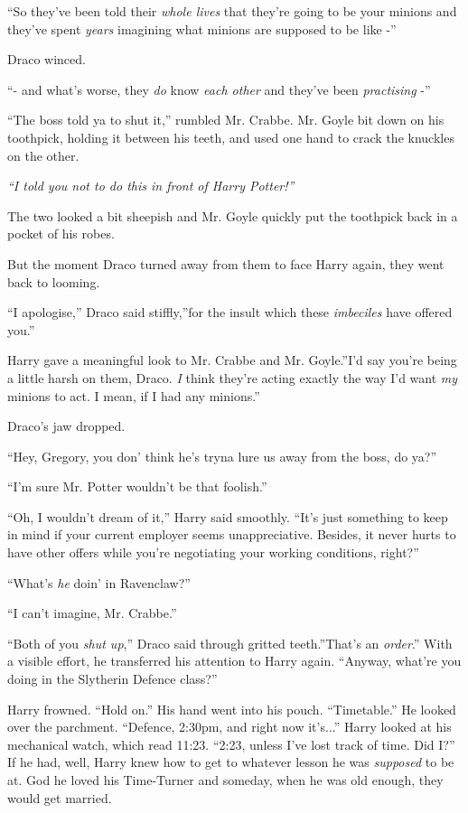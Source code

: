 ``So they've been told their \emph{whole lives} that they're going to be
your minions and they've spent \emph{years} imagining what minions are
supposed to be like -''

Draco winced.

``- and what's worse, they \emph{do} know \emph{each other} and they've
been \emph{practising} -''

``The boss told ya to shut it,'' rumbled Mr. Crabbe. Mr. Goyle bit down
on his toothpick, holding it between his teeth, and used one hand to
crack the knuckles on the other.

\emph{``I told you not to do this in front of Harry Potter!''}

The two looked a bit sheepish and Mr. Goyle quickly put the toothpick
back in a pocket of his robes.

But the moment Draco turned away from them to face Harry again, they
went back to looming.

``I apologise,'' Draco said stiffly,''for the insult which these
\emph{imbeciles} have offered you.''

Harry gave a meaningful look to Mr. Crabbe and Mr. Goyle.''I'd say
you're being a little harsh on them, Draco. \emph{I} think they're
acting exactly the way I'd want \emph{my} minions to act. I mean, if I
had any minions.''

Draco's jaw dropped.

``Hey, Gregory, you don' think he's tryna lure us away from the boss, do
ya?''

``I'm sure Mr. Potter wouldn't be that foolish.''

``Oh, I wouldn't dream of it,'' Harry said smoothly. ``It's just
something to keep in mind if your current employer seems unappreciative.
Besides, it never hurts to have other offers while you're negotiating
your working conditions, right?''

``What's \emph{he} doin' in Ravenclaw?''

``I can't imagine, Mr. Crabbe.''

``Both of you \emph{shut up},'' Draco said through gritted teeth.''That's
an \emph{order}.'' With a visible effort, he transferred his attention
to Harry again. ``Anyway, what're you doing in the Slytherin Defence
class?''

Harry frowned. ``Hold on.'' His hand went into his pouch. ``Timetable.''
He looked over the parchment. ``Defence, 2:30pm, and right now
it's...'' Harry looked at his mechanical watch, which read 11:23.
``2:23, unless I've lost track of time. Did I?'' If he had, well, Harry
knew how to get to whatever lesson he was \emph{supposed} to be at. God
he loved his Time-Turner and someday, when he was old enough, they would
get married.

